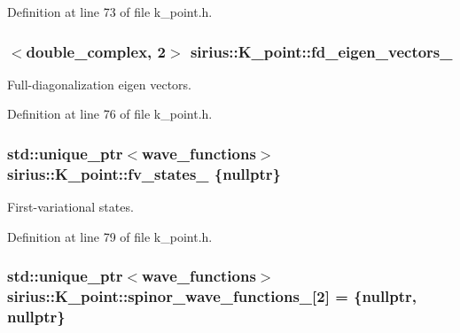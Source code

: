Definition at line 73 of file k\+\_\+point.\+h.

\hypertarget{classsirius_1_1_k__point_a48ae51c27177ebd8fdd019a127ef74f9}{}
\subsubsection[{fd\+\_\+eigen\+\_\+vectors\+\_\+}]{$<$double\+\_\+complex, 2$>$ sirius\+::\+K\+\_\+point\+::fd\+\_\+eigen\+\_\+vectors\+\_\+\hspace{0.3cm}{\ttfamily [private]}}\label{classsirius_1_1_k__point_a48ae51c27177ebd8fdd019a127ef74f9}


Full-\/diagonalization eigen vectors. 



Definition at line 76 of file k\+\_\+point.\+h.

\hypertarget{classsirius_1_1_k__point_aca363c2385edb532f9e266c1956dbb5f}{}
\subsubsection[{fv\+\_\+states\+\_\+}]{\setlength{\rightskip}{0pt plus 5cm}std\+::unique\+\_\+ptr$<${\bf wave\+\_\+functions}$>$ sirius\+::\+K\+\_\+point\+::fv\+\_\+states\+\_\+ \{nullptr\}\hspace{0.3cm}{\ttfamily [private]}}\label{classsirius_1_1_k__point_aca363c2385edb532f9e266c1956dbb5f}


First-\/variational states. 



Definition at line 79 of file k\+\_\+point.\+h.

\hypertarget{classsirius_1_1_k__point_a9c1d2d51e282f776c034d80a698885a9}{}
\subsubsection[{spinor\+\_\+wave\+\_\+functions\+\_\+}]{\setlength{\rightskip}{0pt plus 5cm}std\+::unique\+\_\+ptr$<${\bf wave\+\_\+functions}$>$ sirius\+::\+K\+\_\+point\+::spinor\+\_\+wave\+\_\+functions\+\_\+\mbox{[}2\mbox{]} = \{nullptr, nullptr\}\hspace{0.3cm}{\ttfamily [private]}}\label{classsirius_1_1_k__point_a9c1d2d51e282f776c034d80a698885a9}


